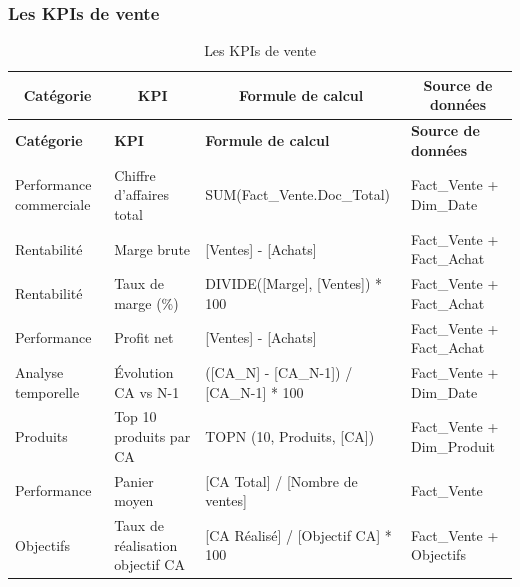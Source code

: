 \subsubsection{Les KPIs de vente}

{\small
\renewcommand{\arraystretch}{1.2}
\setlength{\tabcolsep}{4pt}


\begin{longtable}{|p{3.5cm}|p{3.2cm}|p{5cm}|p{5cm}|}

\caption{Les KPIs de vente} \\

\hline
\multicolumn{1}{|c|}{\textbf{Catégorie}} & 
\multicolumn{1}{c|}{\textbf{KPI}} & 
\multicolumn{1}{c|}{\textbf{Formule de calcul}} & 
\multicolumn{1}{c|}{\textbf{Source de données}} \\
\hline
\endfirsthead

\hline
\rowcolor{cyan!10}
\textbf{Catégorie} & \textbf{KPI} & \textbf{Formule de calcul} & \textbf{Source de données} \\
\hline
\endhead

\hline
\endfoot

Performance commerciale & Chiffre d'affaires total & SUM(Fact\_Vente.Doc\_Total) & Fact\_Vente + Dim\_Date \\
\hline

Rentabilité & Marge brute & [Ventes] - [Achats] & Fact\_Vente + Fact\_Achat \\
\hline

Rentabilité & Taux de marge (\%) & DIVIDE([Marge], [Ventes]) * 100 & Fact\_Vente + Fact\_Achat \\
\hline

Performance & Profit net & [Ventes] - [Achats] & Fact\_Vente + Fact\_Achat \\
\hline

Analyse temporelle & Évolution CA vs N-1 & ([CA\_N] - [CA\_N-1]) / [CA\_N-1] * 100 & Fact\_Vente + Dim\_Date \\
\hline

Produits & Top 10 produits par CA & TOPN (10, Produits, [CA]) & Fact\_Vente + Dim\_Produit \\
\hline

Performance & Panier moyen & [CA Total] / [Nombre de ventes] & Fact\_Vente \\
\hline

Objectifs & Taux de réalisation objectif CA & [CA Réalisé] / [Objectif CA] * 100 & Fact\_Vente + Objectifs \\
\hline

\end{longtable}

}
